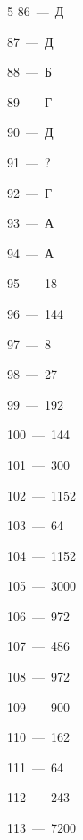 \documentclass[12pt]{article}
\begin{document}
\begin{multicols}{5}
\mbox{86~--- Д}\par
\mbox{87~--- Д}\par
\mbox{88~--- Б}\par
\mbox{89~--- Г}\par
\mbox{90~--- Д}\par
\mbox{91~--- ?}\par
\mbox{92~--- Г}\par
\mbox{93~--- А}\par
\mbox{94~--- А}\par
\mbox{95~--- 18}\par
\mbox{96~--- 144}\par
\mbox{97~--- 8}\par
\mbox{98~--- 27}\par
\mbox{99~--- 192}\par
\mbox{100~--- 144}\par
\mbox{101~--- 300}\par
\mbox{102~--- 1152}\par
\mbox{103~--- 64}\par
\mbox{104~--- 1152}\par
\mbox{105~--- 3000}\par
\mbox{106~--- 972}\par
\mbox{107~--- 486}\par
\mbox{108~--- 972}\par
\mbox{109~--- 900}\par
\mbox{110~--- 162}\par
\mbox{111~--- 64}\par
\mbox{112~--- 243}\par
\mbox{113~--- 7200}
\end{multicols}
\end{document}
